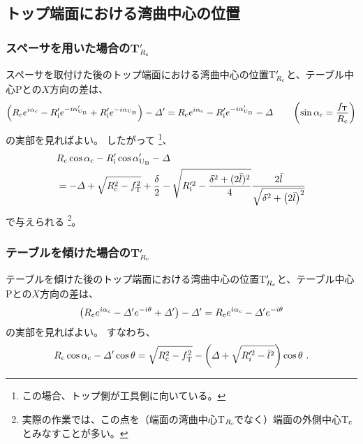 \subsection{トップ端面における湾曲中心の位置}


\subsubsection{スペーサを用いた場合のT$_{R_\text c}'$}
スペーサを取付けた後のトップ端面における湾曲中心の位置T$_{R_\text c}'$と、テーブル中心Pとの$X$方向の差は、
\begin{align*}
  \left(
    R_\text ce^{i\alpha_\text c}-R_\text i'e^{-i\alpha'_{\text U_\text B}}+R_\text i'e^{-i\alpha_{\text U_\text B}}
  \right)
  -\varDelta'
  = R_\text ce^{i\alpha_\text c}-R_\text i'e^{-i\alpha'_{\text U_\text B}}-\varDelta \qquad
    \left(\sin\alpha_\text c = \frac{f_\text T}{R_\text c}\right)
\end{align*}
の実部を見ればよい。
したがって
\footnote{この場合、トップ側が工具側に向いている。}、
\begin{align}
  \notag
  &  R_\text c\cos\alpha_\text c-R_\text i'\cos\alpha'_{\text U_\text B}-\varDelta\\
  &= -\varDelta+\sqrt{R_\text c^2-f_\text T^2}+\frac\delta2
     -\sqrt{R_\text i'^2-\frac{\delta^2+(2\bar l)^2}4}\frac{2\bar l}{\sqrt{\delta^2+\left(2\bar l\right)^2}}
     \label{eq:spacerTRc}
\end{align}
で与えられる
\footnote{実際の作業では、この点を（端面の湾曲中心T$_{R_\text c}\!$でなく）端面の外側中心T$_\text c$とみなすことが多い。}。


\subsubsection{テーブルを傾けた場合のT$_{R_\text c}'$}
テーブルを傾けた後のトップ端面における湾曲中心の位置T$_{R_\text c}'$と、テーブル中心Pとの$X$方向の差は、
\begin{align*}
  \left(R_\text ce^{i\alpha_\text c}-\varDelta'e^{-i\theta}+\varDelta'\right)-\varDelta'
  = R_\text ce^{i\alpha_\text c}-\varDelta'e^{-i\theta}
\end{align*}
の実部を見ればよい。
すなわち、
\begin{align}
  \label{eq:tableTRc}
  R_\text c\cos\alpha_\text c-\varDelta'\cos\theta
  = \sqrt{R_\text c^2-f_\text T^2}-\left(\varDelta+\sqrt{R_i'^2-\bar l^2}\right)\cos\theta~.
\end{align}



